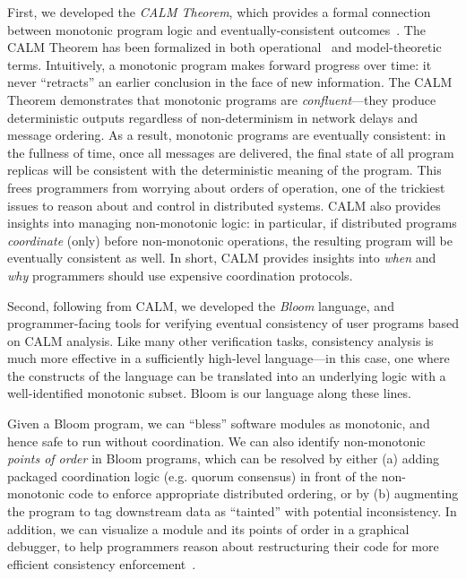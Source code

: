 First, we developed the \emph{CALM Theorem}, which provides a formal connection between monotonic program logic and eventually-consistent outcomes~\cite{podskey}.  The CALM Theorem has been formalized in both operational~\cite{Ameloot2011,Abiteboul2011} and model-theoretic~\cite{marczak2012} terms.    Intuitively, a monotonic program makes forward progress over time: it never ``retracts'' an earlier conclusion in the face of new information.   The CALM Theorem demonstrates that monotonic programs are \emph{confluent}---they produce deterministic outputs regardless of non-determinism in network delays and message ordering.  As a result, monotonic programs are eventually consistent: in the fullness of time, once all messages are delivered, the final state of all program replicas will be consistent with the deterministic meaning of the program.  This frees programmers from worrying about orders of operation, one of the trickiest issues to reason about and control in distributed systems.  CALM also provides insights into managing non-monotonic logic: in particular, if distributed programs \emph{coordinate} (only) before non-monotonic operations, the resulting program will be eventually consistent as well.  In short, CALM provides insights into \emph{when} and \emph{why} programmers should use expensive coordination protocols.

Second, following from CALM, we developed the \emph{Bloom} language, and programmer-facing tools for verifying eventual consistency of user programs based on CALM analysis. Like many other verification tasks, consistency analysis is much more effective in a sufficiently high-level language---in this case, one where the constructs of the language can be translated into an underlying logic with a well-identified monotonic subset. Bloom is our language along these lines. 

Given a Bloom program, we can ``bless'' software modules as monotonic, and hence safe to run without coordination.  We can also identify non-monotonic \emph{points of order} in Bloom programs, which can be resolved by either (a) adding packaged coordination logic (e.g. quorum consensus) in front of the non-monotonic code to enforce appropriate distributed ordering, or by (b) augmenting the program to tag downstream data as ``tainted'' with potential inconsistency.  In addition, we can visualize a module and its points of order in a graphical debugger, to help programmers reason about restructuring their code for more efficient consistency enforcement~\cite{bloom}.

